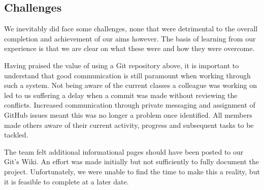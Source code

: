 \subsection{Challenges}
We inevitably did face some challenges, none that were detrimental to the overall completion and achievement of our aims however. The basis of learning from our experience is that we are clear on what these were and how they were overcome. 

Having praised the value of using a Git repository above, it is important to understand that good communication is still paramount when working through such a system. Not being aware of the current classes a colleague was working on led to us suffering a delay when a commit was made without reviewing the conflicts. Increased communication through private messaging and assignment of GitHub issues meant this was no longer a problem once identified. All members made others aware of their current activity, progress and subsequent tasks to be tackled.

The team felt additional informational pages should have been posted to our Git's Wiki. An effort was made initially but not sufficiently to fully document the project. Unfortunately, we were unable to find the time to make this a reality, but it is feasible to complete at a later date.

